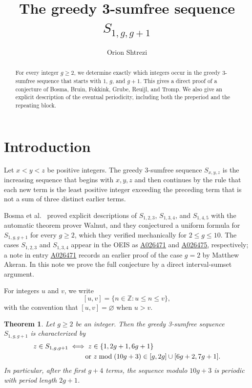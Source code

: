 \documentclass[12pt]{article}
\title{The greedy 3-sumfree sequence $S_{1,g,g+1}$}
\author{Orion Shtrezi}
\date{}
\newtheorem{theorem}{Theorem}
\newcommand{\seqnum}[1]{\href{https://oeis.org/#1}{\rm \underline{#1}}}
\begin{document}
\maketitle

\begin{abstract}
For every integer $g\ge 2$, we determine exactly which integers occur in the greedy 3-sumfree sequence that starts with $1$, $g$, and $g+1$. This gives a direct proof of a conjecture of Bosma, Bruin, Fokkink, Grube, Reuijl, and Tromp. We also give an explicit description of the eventual periodicity, including both the preperiod and the repeating block.
\end{abstract}

\section{Introduction}\label{sec:intro}

Let $x<y<z$ be positive integers. The greedy 3-sumfree sequence $S_{x,y,z}$ is the increasing sequence that begins with $x,y,z$ and then continues by the rule that each new term is the least positive integer exceeding the preceding term that is not a sum of three distinct earlier terms.

Bosma et al.\ \cite[Theorem~15 and Conjecture~16]{BosmaEtAl} proved explicit descriptions of $S_{1,2,3}$, $S_{1,3,4}$, and $S_{1,4,5}$ with the automatic theorem prover Walnut, and they conjectured a uniform formula for $S_{1,g,g+1}$ for every $g\ge 2$, which they verified mechanically for $2\le g\le 10$. The cases $S_{1,2,3}$ and $S_{1,3,4}$ appear in the OEIS \cite{OEIS} as \seqnum{A026471} and \seqnum{A026475}, respectively; a note in entry \seqnum{A026471} records an earlier proof of the case $g=2$ by Matthew Akeran. In this note we prove the full conjecture by a direct interval-sumset argument.

For integers $u$ and $v$, we write
\[
[u,v]=\{n\in\mathbb Z : u\le n\le v\},
\]
with the convention that $[u,v]=\varnothing$ when $u>v$.

\begin{theorem}\label{thm:main}
Let $g\ge 2$ be an integer. Then the greedy 3-sumfree sequence $S_{1,g,g+1}$ is characterized by
\begin{equation}\label{eq:main}
\begin{aligned}
 z\in S_{1,g,g+1}
 &\iff
 z\in\{1,2g+1,6g+1\} \\
 &\hspace{2.5em}\text{or } z\bmod(10g+3)\in[g,2g]\cup[6g+2,7g+1].
\end{aligned}
\end{equation}
In particular, after the first $g+4$ terms, the sequence modulo $10g+3$ is periodic with period length $2g+1$.
\end{theorem}
\end{document}
